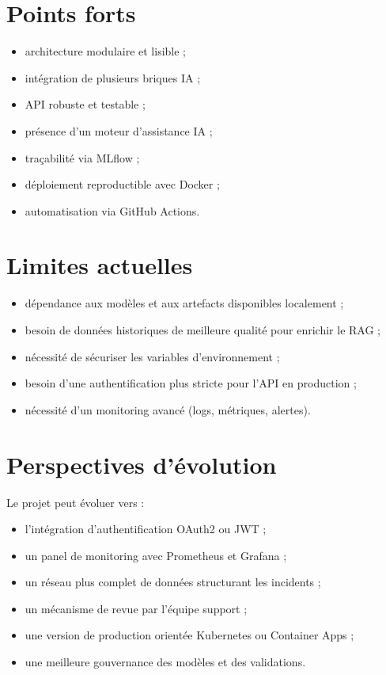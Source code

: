 \documentclass[11pt,a4paper]{report}
\begin{document}
\section{Points forts}
\begin{itemize}[leftmargin=1.3em]
    \item architecture modulaire et lisible ;
    \item intégration de plusieurs briques IA ;
    \item API robuste et testable ;
    \item présence d’un moteur d’assistance IA ;
    \item traçabilité via MLflow ;
    \item déploiement reproductible avec Docker ;
    \item automatisation via GitHub Actions.
\end{itemize}

\section{Limites actuelles}
\begin{itemize}[leftmargin=1.3em]
    \item dépendance aux modèles et aux artefacts disponibles localement ;
    \item besoin de données historiques de meilleure qualité pour enrichir le RAG ;
    \item nécessité de sécuriser les variables d’environnement ;
    \item besoin d’une authentification plus stricte pour l’API en production ;
    \item nécessité d’un monitoring avancé (logs, métriques, alertes).
\end{itemize}

\section{Perspectives d’évolution}
Le projet peut évoluer vers :
\begin{itemize}[leftmargin=1.3em]
    \item l’intégration d’authentification OAuth2 ou JWT ;
    \item un panel de monitoring avec Prometheus et Grafana ;
    \item un réseau plus complet de données structurant les incidents ;
    \item un mécanisme de revue par l’équipe support ;
    \item une version de production orientée Kubernetes ou Container Apps ;
    \item une meilleure gouvernance des modèles et des validations.
\end{itemize}
\end{document}
